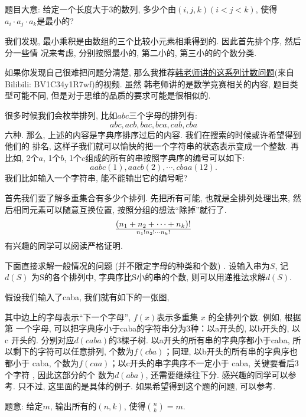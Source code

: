 题目大意: 给定一个长度大于3的数列, 多少个由$(i,j,k)(i < j < k) $, 使得$a_i\cdot a_j\cdot a_k$是最小的? 

我们发现, 最小乘积是由数组的三个比较小元素相乘得到的. 因此首先排个序, 然后分一些情
况来考虑, 分别按照最小的, 第二小的, 第三小的的个数分类. 

如果你发现自己很难把问题分清楚, 那么我推荐\href{https://www.bilibili.com/video/BV1C34y1R7wf}{韩老师讲的这系列计数问题}(来自Bilibili: BV1C34y1R7wf)的视频. 虽然
韩老师讲的是数学竞赛相关的内容, 题目类型可能不同, 但是对于思维的品质的要求可能是很相似的. 

 很多时候我们会枚举排列, 比如$abc$三个字母的排列有: 
$$
abc, acb, bac, bca, cab, cba
$$
六种. 那么, 上述的内容是字典序排序过后的内容. 我们在搜索的时候或许希望得到他们的
排名, 这样子我们就可以愉快的把一个字符串的状态表示变成一个整数. 再比如, 2个$a$, 
1个$b$, 1个$c$组成的所有的串按照字典序的编号可以如下: 
$$
aabc(1), aacb(2), \cdots, cbaa(12).
$$
我们比如输入一个字符串, 能不能输出它的编号呢? 

首先我们要了解多重集合有多少个排列. 先把所有可能, 也就是全排列处理出来, 
然后相同元素可以随意互换位置, 按照分组的想法``除掉''就行了. 
$$
(n_1+n_2+\cdots+n_k)!\over n_1!n_2!\cdots n_k!
$$
有兴趣的同学可以阅读严格证明. 

下面直接求解一般情况的问题 (并不限定字母的种类和个数) . 设输入串为$S$, 记$d(S)$
为S的各个排列中, 字典序比S小的串的个数, 则可以用递推法求解$d(S)$.

假设我们输入了caba, 我们就有如下的一张图,


其中边上的字母表示“下一个字母”, $f(x)$表示多重集 $x$ 的全排列个数. 例如, 根据第
一个字母, 可以把字典序小于caba的字符串分为3种：以a开头的, 以b开头的, 以 c 开头的.
分别对应$d(caba)$的3棵子树. 以a开头的所有串的字典序都小于caba, 
所以剩下的字符可以任意排列, 个数为$f(cba)$；同理, 以b开头的所有串的字典序也都小于 caba, 
个数为$f(caa)$；以c开头的串字典序不一定小于 caba, 关键要看后3个字符 , 因此这部分的个
数为$d(aba)$, 还需要继续往下分. 感兴趣的同学可以参考. 
只不过, 这里面的是具体的例子. 如果希望得到这个题的问题, 可以参考. 


题意: 给定$m$, 输出所有的$(n,k)$, 使得$\binom nk=m$. 
